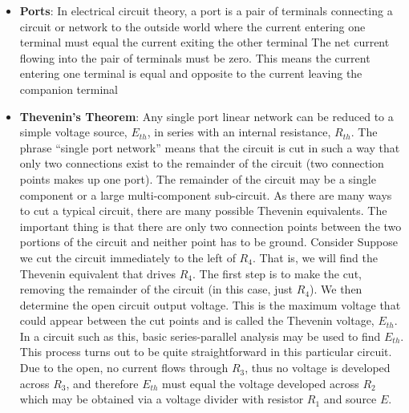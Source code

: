 \documentclass{report}
\begin{document}
\begin{itemize}
\begin{align*}
                V_{b} \approx 11.37V
            .\end{align*}
            If the $6V$ source was reversed, it would pull node $b$ toward $-6V$. Its contribution would then be negative, since $V_{b}$ in this case would be below ground.
        \item \textbf{Ports}: In electrical circuit theory, a port is a pair of terminals connecting a circuit or network to the outside world where the current entering one terminal must equal the current exiting the other terminal
            \bigbreak \noindent 
            The net current flowing into the pair of terminals must be zero. This means the current entering one terminal is equal and opposite to the current leaving the companion terminal
        \item \textbf{Thevenin's Theorem}: Any single port linear network can be reduced to a simple voltage source, $E_{th}$, in series with an internal resistance, $R_{th}$.
            \bigbreak \noindent 
            The phrase “single port network” means that the circuit is cut in such a way that only two connections exist to the remainder of the circuit (two connection points makes up one port). The remainder of the circuit may be a single component or a large multi-component sub-circuit. As there are many ways to cut a typical circuit, there are many possible Thevenin equivalents. The important thing is that there are only two connection points between the two portions of the circuit and neither point has to be ground.
            \bigbreak \noindent 
            Consider
            \bigbreak \noindent 
            \bigbreak \noindent 
            Suppose we cut the circuit immediately to the left of $R_4$. That is, we will find the Thevenin equivalent that drives $R_4$. The first step is to make the cut, removing the remainder of the circuit (in this case, just $R_4$). We then determine the open circuit output voltage. This is the maximum voltage that could appear between the cut points and is called the Thevenin voltage, $E_{th}$.
            \bigbreak \noindent 
            In a circuit such as this, basic series-parallel analysis may be used to find $E_{th}$. This process turns out to be quite straightforward in this particular circuit. Due to the open, no current flows through $R_3$, thus no voltage is developed across $R_3$, and therefore $E_{th}$ must equal the voltage developed across $R_2$ which may be obtained via a voltage divider with resistor $R_1$ and source $E$.
            \bigbreak \noindent 

\end{itemize}
\end{document}
